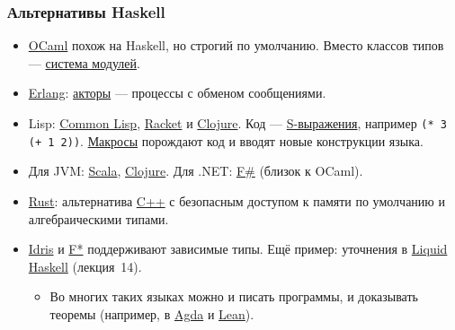 \documentclass[11pt]{beamer}
\begin{document}
\begin{frame}[fragile]
  \frametitle{Альтернативы Haskell}
  \small
  \begin{itemize}
    \setlength{\itemsep}{0pt}
    \item \href{https://ocaml.org/}{OCaml} похож на Haskell, но строгий по умолчанию. Вместо классов типов — \href{https://ocaml.org/manual/5.3/moduleexamples.html}{система модулей}.
    \item \href{https://www.erlang.org/}{Erlang}: \href{https://en.wikipedia.org/wiki/Actor_model}{акторы} — процессы с обменом сообщениями.
    \item Lisp: \href{https://lisp-lang.org/}{Common Lisp}, \href{https://racket-lang.org/}{Racket} и \href{https://clojure.org/}{Clojure}. Код — \href{https://en.wikipedia.org/wiki/S-expression}{S-выражения}, например \texttt{(* 3 (+ 1 2))}. \href{https://gigamonkeys.com/book/macros-defining-your-own.html}{Макросы} порождают код и вводят новые конструкции языка.
          \pause
    \item Для JVM: \href{https://www.scala-lang.org/}{Scala}, \href{https://clojure.org/}{Clojure}. Для .NET: \href{https://fsharp.org/}{F\#} (близок к OCaml).
          \pause
    \item \href{https://rust-lang.org/}{Rust}: альтернатива \href{https://www.open-std.org/jtc1/sc22/wg21/}{C++} с безопасным доступом к памяти по умолчанию и алгебраическими типами.
          \pause
    \item \href{https://idris-lang.org/}{Idris} и \href{https://fstar-lang.org/}{F*} поддерживают зависимые типы. Ещё пример: уточнения в \href{https://ucsd-progsys.github.io/liquidhaskell/}{Liquid Haskell} (лекция~14).
          \begin{itemize}
            \item Во многих таких языках можно и писать программы, и доказывать теоремы (например, в \href{https://agda.readthedocs.io/en/latest/getting-started/what-is-agda.html}{Agda} и \href{https://lean-lang.org/}{Lean}).
          \end{itemize}
  \end{itemize}
\end{frame}
\end{document}

